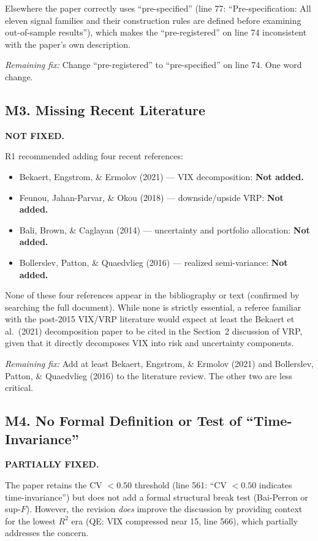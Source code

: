 \documentclass[12pt,a4paper]{article}
\begin{document}
Elsewhere the paper correctly uses ``pre-specified'' (line 77: ``Pre-specification: All eleven signal families and their construction rules are defined before examining out-of-sample results''), which makes the ``pre-registered'' on line 74 inconsistent with the paper's own description.

\textit{Remaining fix:} Change ``pre-registered'' to ``pre-specified'' on line 74. One word change.


\subsection*{M3. Missing Recent Literature}
\textcolor{warncolor}{\textbf{NOT FIXED.}}

R1 recommended adding four recent references:
\begin{itemize}
    \item Bekaert, Engstrom, \& Ermolov (2021) --- VIX decomposition: \textbf{Not added.}
    \item Feunou, Jahan-Parvar, \& Okou (2018) --- downside/upside VRP: \textbf{Not added.}
    \item Bali, Brown, \& Caglayan (2014) --- uncertainty and portfolio allocation: \textbf{Not added.}
    \item Bollerslev, Patton, \& Quaedvlieg (2016) --- realized semi-variance: \textbf{Not added.}
\end{itemize}

None of these four references appear in the bibliography or text (confirmed by searching the full document). While none is strictly essential, a referee familiar with the post-2015 VIX/VRP literature would expect at least the Bekaert et al.\ (2021) decomposition paper to be cited in the Section~2 discussion of VRP, given that it directly decomposes VIX into risk and uncertainty components.

\textit{Remaining fix:} Add at least Bekaert, Engstrom, \& Ermolov (2021) and Bollerslev, Patton, \& Quaedvlieg (2016) to the literature review. The other two are less critical.


\subsection*{M4. No Formal Definition or Test of ``Time-Invariance''}
\textcolor{warncolor}{\textbf{PARTIALLY FIXED.}}

The paper retains the CV $< 0.50$ threshold (line 561: ``CV $< 0.50$ indicates time-invariance'') but does not add a formal structural break test (Bai-Perron or sup-$F$). However, the revision \emph{does} improve the discussion by providing context for the lowest $R^2$ era (QE: VIX compressed near 15, line 566), which partially addresses the concern.
\end{document}
